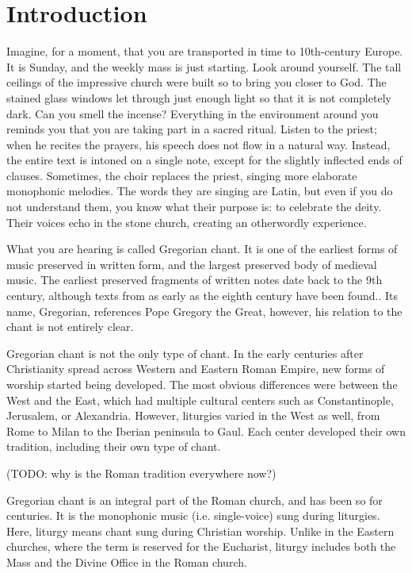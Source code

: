 \chapter*{Introduction}

Imagine, for a moment, that you are transported in time to 10th-century Europe. It is Sunday, and the weekly mass is just
starting. Look around yourself. The tall ceilings of the impressive church were built so to bring you closer to God. The stained glass windows
let through just enough light so that it is not completely dark. Can you smell the incense? Everything in the environment around
you reminds you that you are taking part in a sacred ritual. Listen to the priest; when he recites the prayers, his speech does not 
flow in a natural way. Instead, the entire text is intoned on a single note, except for the slightly inflected ends of clauses. 
Sometimes, the choir replaces the priest, singing more elaborate monophonic melodies. The words they are singing are Latin, but even 
if you do not understand them, you know what their purpose is: to celebrate the deity. Their voices echo in the stone church, creating an
otherwordly experience.

What you are hearing is called Gregorian chant. It is one of the earliest forms of music preserved in written form, and the
largest preserved body of medieval music. The earliest preserved fragments of written notes date back to the 9th century, although texts from as early as 
the eighth century have been found.. Its name, Gregorian, references Pope Gregory the Great, however, his relation to the chant is not entirely clear.

Gregorian chant is not the only type of chant. In the early centuries after Christianity spread across Western and Eastern Roman Empire,
new forms of worship started being developed. The most obvious differences were between the West and the East, which had multiple cultural
centers such as Constantinople, Jerusalem, or Alexandria. However, liturgies varied in the West as well, from Rome to Milan to the Iberian peninsula to Gaul.
Each center developed their own tradition, including their own type of chant. 

(TODO: why is the Roman tradition everywhere now?)

Gregorian chant is an integral part of the Roman church, and has been so for centuries. It is the monophonic music (i.e. single-voice)
sung during liturgies. Here, liturgy means chant sung during Christian worship. Unlike in the Eastern churches, where the term is reserved 
for the Eucharist, liturgy includes both the Mass and the Divine Office in the Roman church.

